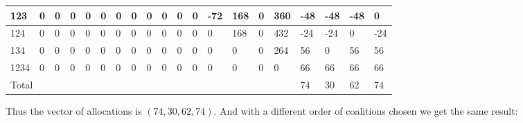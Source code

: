 \documentclass[12pt]{article}
\begin{document}
\begin{table}[h]
\begin{tabular}{|l|l|l|l|l|l|l|l|l|l|l|l|l|l|l|l|l|l|l|l|}
123      & 0  & 0  & 0  & 0  & 0  & 0   & 0   & 0   & 0    & 0   & 0    & -72  & 168 & 0    & 360  & -48    & -48    & -48    & 0     \\ \hline
124      & 0  & 0  & 0  & 0  & 0  & 0   & 0   & 0   & 0    & 0   & 0    & 0    & 168 & 0    & 432  & -24    & -24    & 0      & -24   \\ \hline
134      & 0  & 0  & 0  & 0  & 0  & 0   & 0   & 0   & 0    & 0   & 0    & 0    & 0   & 0    & 264  & 56     & 0      & 56     & 56    \\ \hline
1234     & 0  & 0  & 0  & 0  & 0  & 0   & 0   & 0   & 0    & 0   & 0    & 0    & 0   & 0    & 0    & 66     & 66     & 66     & 66    \\ \hline
\multicolumn{16}{|l|}{Total}                                                                       & 74     & 30     & 62     & 74    \\ \hline
\end{tabular}
\end{table}

Thus the vector of allocations is $(74, 30, 62, 74)$.
And with a different order of coalitions chosen we get the same result:
\end{document}
